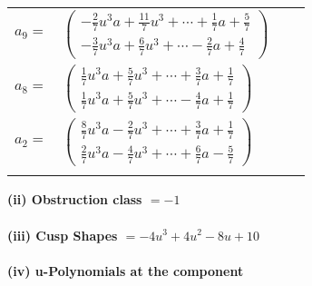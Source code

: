 \documentclass[1p]{elsarticle_modified}
\theoremstyle{definition}
\begin{document}
\begin{tabular}{m{7pt} m{180pt} m{7pt} m{180pt} }
\flushright $a_{9}=$&$\begin{pmatrix}-\frac{2}{7} u^3 a+\frac{11}{7} u^3+\cdots+\frac{1}{7} a+\frac{5}{7}\\-\frac{3}{7} u^3 a+\frac{6}{7} u^3+\cdots-\frac{2}{7} a+\frac{4}{7}\end{pmatrix}$ \\
\flushright $a_{8}=$&$\begin{pmatrix}\frac{1}{7} u^3 a+\frac{5}{7} u^3+\cdots+\frac{3}{7} a+\frac{1}{7}\\\frac{1}{7} u^3 a+\frac{5}{7} u^3+\cdots-\frac{4}{7} a+\frac{1}{7}\end{pmatrix}$ \\
\flushright $a_{2}=$&$\begin{pmatrix}\frac{8}{7} u^3 a-\frac{2}{7} u^3+\cdots+\frac{3}{7} a+\frac{1}{7}\\\frac{2}{7} u^3 a-\frac{4}{7} u^3+\cdots+\frac{6}{7} a-\frac{5}{7}\end{pmatrix}$\\&\end{tabular}
\flushleft \textbf{(ii) Obstruction class $= -1$}\\~\\
\flushleft \textbf{(iii) Cusp Shapes $= -4 u^3+4 u^2-8 u+10$}\\~\\
\newpage\renewcommand{\arraystretch}{1}
\flushleft \textbf{(iv) u-Polynomials at the component}\newline \\
\end{document}
